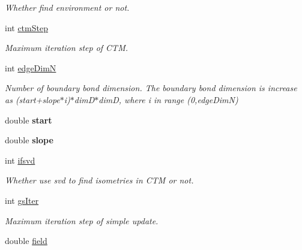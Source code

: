 \begin{DoxyCompactItemize}
\begin{DoxyCompactList}\small\item\em Whether find environment or not. \end{DoxyCompactList}\item 
int \hyperlink{structparaPess_aaca789975128b3392acb642c31e56e31}{ctm\+Step}\hypertarget{structparaPess_aaca789975128b3392acb642c31e56e31}{}\label{structparaPess_aaca789975128b3392acb642c31e56e31}

\begin{DoxyCompactList}\small\item\em Maximum iteration step of C\+TM. \end{DoxyCompactList}\item 
int \hyperlink{structparaPess_a3c1ea82ae4543d1a21b2f32e5bae31ef}{edge\+DimN}\hypertarget{structparaPess_a3c1ea82ae4543d1a21b2f32e5bae31ef}{}\label{structparaPess_a3c1ea82ae4543d1a21b2f32e5bae31ef}

\begin{DoxyCompactList}\small\item\em Number of boundary bond dimension. The boundary bond dimension is increase as (start+slope$\ast$i)$\ast$dim\+D$\ast$dimD, where i in range (0,edge\+DimN) \end{DoxyCompactList}\item 
double {\bfseries start}\hypertarget{structparaPess_a4c29a878eb0bde695bfe11f00a551693}{}\label{structparaPess_a4c29a878eb0bde695bfe11f00a551693}

\item 
double {\bfseries slope}\hypertarget{structparaPess_aedf548e32229c59721bb64384fa82b1d}{}\label{structparaPess_aedf548e32229c59721bb64384fa82b1d}

\item 
int \hyperlink{structparaPess_adf1b3373be46411ef5b394cbeb5405f5}{ifsvd}\hypertarget{structparaPess_adf1b3373be46411ef5b394cbeb5405f5}{}\label{structparaPess_adf1b3373be46411ef5b394cbeb5405f5}

\begin{DoxyCompactList}\small\item\em Whether use svd to find isometries in C\+TM or not. \end{DoxyCompactList}\item 
int \hyperlink{structparaPess_a9f41ab90c8234fdbd8f163acabce9fd5}{gs\+Iter}\hypertarget{structparaPess_a9f41ab90c8234fdbd8f163acabce9fd5}{}\label{structparaPess_a9f41ab90c8234fdbd8f163acabce9fd5}

\begin{DoxyCompactList}\small\item\em Maximum iteration step of simple update. \end{DoxyCompactList}\item 
double \hyperlink{structparaPess_a98a8b87ee7c893eedcbc67ff6ae01028}{field}\hypertarget{structparaPess_a98a8b87ee7c893eedcbc67ff6ae01028}{}\label{structparaPess_a98a8b87ee7c893eedcbc67ff6ae01028}


\end{DoxyCompactItemize}
